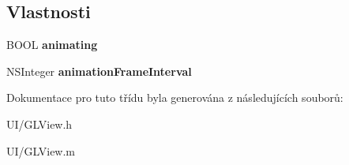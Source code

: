 \subsection*{Vlastnosti}
\begin{DoxyCompactItemize}
\item 
\hypertarget{interface_g_l_view_ab42d23036c1353fe406be903c4cb2444}{B\-O\-O\-L {\bfseries animating}}\label{d8/d4d/interface_g_l_view_ab42d23036c1353fe406be903c4cb2444}

\item 
\hypertarget{interface_g_l_view_a379acc432018d6a4c2685d84a66e3ab9}{N\-S\-Integer {\bfseries animation\-Frame\-Interval}}\label{d8/d4d/interface_g_l_view_a379acc432018d6a4c2685d84a66e3ab9}

\end{DoxyCompactItemize}


Dokumentace pro tuto třídu byla generována z následujících souborů\-:\begin{DoxyCompactItemize}
\item 
U\-I/G\-L\-View.\-h\item 
U\-I/G\-L\-View.\-m\end{DoxyCompactItemize}
